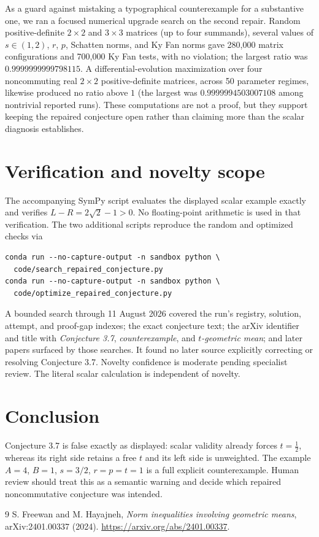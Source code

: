 \documentclass[11pt]{article}
\begin{document}
As a guard against mistaking a typographical counterexample for a substantive
one, we ran a focused numerical upgrade search on the second repair.  Random
positive-definite $2\times2$ and $3\times3$ matrices (up to four summands),
several values of $s\in(1,2)$, $r$, $p$, Schatten norms, and Ky Fan norms
gave 280,000 matrix configurations and 700,000 Ky Fan tests, with no
violation; the largest ratio was
$0.9999999999798115$.  A differential-evolution maximization over four
noncommuting real $2\times2$ positive-definite matrices, across 50 parameter
regimes, likewise produced no ratio above $1$ (the largest was
$0.9999994503007108$ among nontrivial reported runs).  These computations are
not a proof, but they support keeping the repaired conjecture open rather than
claiming more than the scalar diagnosis establishes.

\section{Verification and novelty scope}

The accompanying SymPy script evaluates the displayed scalar example exactly
and verifies $L-R=2\sqrt2-1>0$.  No floating-point arithmetic is used in that
verification.  The two additional scripts reproduce the random and optimized
checks via
\begin{verbatim}
conda run --no-capture-output -n sandbox python \
  code/search_repaired_conjecture.py
conda run --no-capture-output -n sandbox python \
  code/optimize_repaired_conjecture.py
\end{verbatim}

A bounded search through 11 August 2026 covered the run's registry, solution,
attempt, and proof-gap indexes; the exact conjecture text; the arXiv identifier
and title with \emph{Conjecture 3.7}, \emph{counterexample}, and
\emph{$t$-geometric mean}; and later papers surfaced by those searches.  It
found no later source explicitly correcting or resolving Conjecture 3.7.
Novelty confidence is moderate pending specialist review.  The literal scalar
calculation is independent of novelty.

\section{Conclusion}

Conjecture 3.7 is false exactly as displayed: scalar validity already forces
$t=\tfrac12$, whereas its right side retains a free $t$ and its left side is
unweighted.  The example $A=4$, $B=1$, $s=3/2$, $r=p=t=1$ is a full explicit
counterexample.  Human review should treat this as a semantic warning and
decide which repaired noncommutative conjecture was intended.

\begin{thebibliography}{9}
S. Freewan and M. Hayajneh,
\emph{Norm inequalities involving geometric means},
arXiv:2401.00337 (2024).
\url{https://arxiv.org/abs/2401.00337}.
\end{thebibliography}
\end{document}
